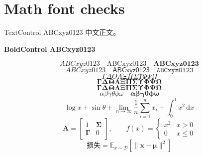 \documentclass{uestcthesis}
\begin{document}
\uestcmainmatter
\chapter{Math font checks}
\noindent TextControl ABCxyz0123 中文正文。\par
\noindent\textbf{BoldControl ABCxyz0123}\par
\[
 ABCxyz0123\quad\mathrm{ABCxyz0123}\quad\mathbf{ABCxyz0123}
\]
\[
 \mathit{ABCxyz0123}\quad\mathsf{ABCxyz0123}\quad\mathtt{ABCxyz0123}
\]
\[
 \Gamma\Delta\Theta\Lambda\Xi\Pi\Sigma\Upsilon\Phi\Psi\Omega
\]
\[
 \mathbf{\Gamma\Delta\Theta\Lambda\Xi\Pi\Sigma\Upsilon\Phi\Psi\Omega}
\]
\[
 \boldsymbol{\Gamma\Delta\Theta\Lambda\Xi\Pi\Sigma\Upsilon\Phi\Psi\Omega}
\]
\[
 \alpha\beta\gamma\theta\phi\omega\quad
 \boldsymbol{\alpha\beta\gamma\theta\phi\omega}
\]
\[
 \log x+\sin\theta+\lim_{n\to\infty}\frac1n\sum_{i=1}^n x_i
 +\int_0^1 x^2\,\mathrm{d}x
\]
\[
 \mathbf{A}=\begin{bmatrix}1&\mathbf{\Sigma}\\\mathbf{\Gamma}&0\end{bmatrix},
 \qquad f(x)=\begin{cases}x^2&x>0\\0&x\leq0\end{cases}
\]
\[
 \text{损失}=\mathbb{E}_{x\sim\mathcal D}
 [\lVert\mathbf{x}-\boldsymbol{\mu}\rVert^2]
\]
\end{document}
